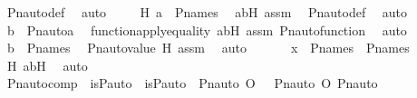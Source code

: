\begin{isabellebody}
\ Pn{\isacharunderscore}{\kern0pt}auto{\isacharunderscore}{\kern0pt}def\ \isamarkupfalse%
\ auto\ \isanewline
\ \ \isamarkupfalse%
\ H{\isacharcolon}{\kern0pt}\ {\isachardoublequoteopen}a\ {\isasymin}\ P{\isacharunderscore}{\kern0pt}names{\isachardoublequoteclose}\ \isamarkupfalse%
\ abH\ assm\ \isamarkupfalse%
\ Pn{\isacharunderscore}{\kern0pt}auto{\isacharunderscore}{\kern0pt}def\ \isamarkupfalse%
\ auto\ \isanewline
\ \ \isamarkupfalse%
\ {\isachardoublequoteopen}b\ {\isacharequal}{\kern0pt}\ Pn{\isacharunderscore}{\kern0pt}auto{\isacharparenleft}{\kern0pt}{\isasympi}{\isacharparenright}{\kern0pt}{\isacharbackquote}{\kern0pt}a{\isachardoublequoteclose}\ \isamarkupfalse%
\ function{\isacharunderscore}{\kern0pt}apply{\isacharunderscore}{\kern0pt}equality\ abH\ assm\ Pn{\isacharunderscore}{\kern0pt}auto{\isacharunderscore}{\kern0pt}function\ \isamarkupfalse%
\ auto\ \isanewline
\ \ \isamarkupfalse%
\ \isamarkupfalse%
\ {\isachardoublequoteopen}b\ {\isasymin}\ P{\isacharunderscore}{\kern0pt}names{\isachardoublequoteclose}\ \isamarkupfalse%
\ Pn{\isacharunderscore}{\kern0pt}auto{\isacharunderscore}{\kern0pt}value\ H\ assm\ \isamarkupfalse%
\ auto\ \isanewline
\ \ \isamarkupfalse%
\ \isamarkupfalse%
\ {\isachardoublequoteopen}x\ {\isasymin}\ P{\isacharunderscore}{\kern0pt}names\ {\isasymtimes}\ P{\isacharunderscore}{\kern0pt}names{\isachardoublequoteclose}\ \isamarkupfalse%
\ H\ abH\ \isamarkupfalse%
\ auto\isanewline
{}\isamarkupfalse%
%
\endisatagproof
{\isafoldproof}%
%
\isadelimproof
\isanewline
%
\endisadelimproof
\isanewline
{}\isamarkupfalse%
\ Pn{\isacharunderscore}{\kern0pt}auto{\isacharunderscore}{\kern0pt}comp\ {\isacharcolon}{\kern0pt}\ {\isachardoublequoteopen}is{\isacharunderscore}{\kern0pt}P{\isacharunderscore}{\kern0pt}auto{\isacharparenleft}{\kern0pt}{\isasympi}{\isacharparenright}{\kern0pt}\ {\isasymLongrightarrow}\ is{\isacharunderscore}{\kern0pt}P{\isacharunderscore}{\kern0pt}auto{\isacharparenleft}{\kern0pt}{\isasymtau}{\isacharparenright}{\kern0pt}\ {\isasymLongrightarrow}\ Pn{\isacharunderscore}{\kern0pt}auto{\isacharparenleft}{\kern0pt}{\isasympi}\ O\ {\isasymtau}{\isacharparenright}{\kern0pt}\ {\isacharequal}{\kern0pt}\ Pn{\isacharunderscore}{\kern0pt}auto{\isacharparenleft}{\kern0pt}{\isasympi}{\isacharparenright}{\kern0pt}\ O\ Pn{\isacharunderscore}{\kern0pt}auto{\isacharparenleft}{\kern0pt}{\isasymtau}{\isacharparenright}{\kern0pt}{\isachardoublequoteclose}\ \isanewline

\end{isabellebody}

